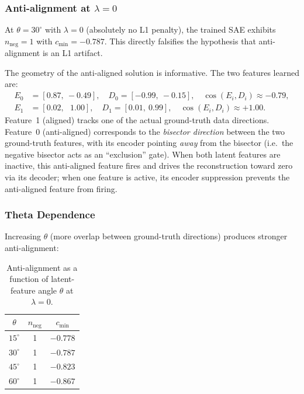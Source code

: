 \documentclass[11pt,a4paper]{article}
\newcommand{\cosED}{\cos(E_i, D_i)}
\newcommand{\nneg}{n_{\mathrm{neg}}}
\begin{document}
\subsubsection{Anti-alignment at \texorpdfstring{$\lambda = 0$}{lambda=0}}

\begin{revealed}
At $\theta = 30^\circ$ with \textbf{$\lambda = 0$} (absolutely no L1 penalty),
the trained SAE exhibits $\nneg = 1$ with $c_{\min} = -0.787$.  This directly falsifies
the hypothesis that anti-alignment is an L1 artifact.
\end{revealed}

The geometry of the anti-aligned solution is informative.  The two features learned are:
\begin{align*}
  E_0 &= [0.87,\ -0.49], \quad D_0 = [-0.99,\ -0.15], \quad \cosED \approx -0.79,\\
  E_1 &= [0.02,\ \ \ 1.00], \quad D_1 = [0.01,\  0.99], \quad \cosED \approx +1.00.
\end{align*}
Feature~1 (aligned) tracks one of the actual ground-truth data directions.  Feature~0
(anti-aligned) corresponds to the \emph{bisector direction} between the two ground-truth
features, with its encoder pointing \emph{away} from the bisector (i.e.\ the negative
bisector acts as an ``exclusion'' gate).  When both latent features are inactive, this
anti-aligned feature fires and drives the reconstruction toward zero via its decoder; when
one feature is active, its encoder suppression prevents the anti-aligned feature from firing.

\subsubsection{Theta Dependence}

Increasing $\theta$ (more overlap between ground-truth directions) produces stronger
anti-alignment:

\begin{table}[H]
\centering
\caption{Anti-alignment as a function of latent-feature angle $\theta$ at $\lambda = 0$.}
\label{tab:theta}
\begin{tabular}{@{}ccc@{}}
\toprule
$\theta$ & $\nneg$ & $c_{\min}$\\
\midrule
$15^\circ$ & 1 & $-0.778$\\
$30^\circ$ & 1 & $-0.787$\\
$45^\circ$ & 1 & $-0.823$\\
$60^\circ$ & 1 & $-0.867$\\
\bottomrule
\end{tabular}
\end{table}
\end{document}
